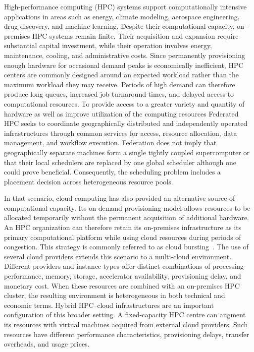 \documentclass[conference]{IEEEtran}
\begin{document}
High-performance computing  (HPC) systems support computationally intensive applications in areas such as energy, climate modeling, aerospace engineering, drug discovery, and machine learning. 
Despite their computational capacity, on-premises HPC systems remain finite. Their acquisition and expansion require substantial capital investment, while their operation involves energy, maintenance, cooling, and administrative costs. Since permanently provisioning enough hardware for occasional demand peaks is economically inefficient, HPC centers are commonly designed around an expected workload rather than the maximum workload they may receive. Periods of high demand can therefore produce long queues, increased job turnaround times, and delayed access to computational resources. To provide access to a greater variety and quantity of hardware as well as improve utilization of the computing resources\cite{Magugliani2025} Federated HPC seeks to coordinate geographically distributed and independently operated infrastructures through common services for access, resource allocation, data management, and workflow execution.  Federation does not imply that geographically separate machines form a single tightly coupled supercomputer or that their local schedulers are replaced by one global scheduler although one could prove beneficial. Consequently, the scheduling problem includes a placement decision across heterogeneous resource pools.

In that scenario, cloud computing has also  provided an alternative source of computational capacity. Its on-demand provisioning model allows resources to be allocated temporarily without the permanent acquisition of additional hardware. An HPC organization can therefore retain its on-premises infrastructure as its primary computational platform while using cloud resources during periods of congestion. This strategy is commonly referred to as cloud bursting~\cite{BUYYA2009599,mell2011nist}. The use of several cloud providers extends this scenario to a multi-cloud environment. Different providers and instance types offer distinct combinations of processing performance, memory, storage, accelerator availability, provisioning delay, and monetary cost. When these resources are combined with an on-premises HPC cluster, the resulting environment is heterogeneous in both technical and economic terms. Hybrid HPC--cloud infrastructures are an important configuration of this broader setting. A fixed-capacity HPC centre can augment its resources with virtual machines acquired from external cloud providers. Such resources have different performance characteristics, provisioning delays, transfer overheads, and usage prices. 
\end{document}
